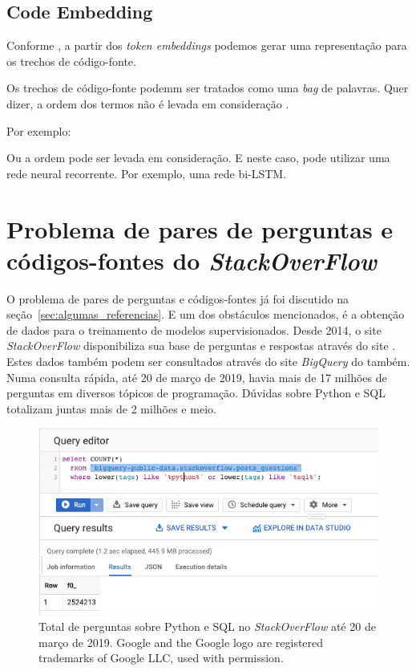 \subsection{Code Embedding}

Conforme \cite{cambronero-deep-learning-code-search:2019}, a partir dos \textit{token embeddings} podemos gerar uma representação para os trechos de código-fonte.

Os trechos de código-fonte podemm ser tratados como uma \textit{bag} de palavras. Quer dizer, a ordem dos termos não é levada em consideração \citep{cambronero-deep-learning-code-search:2019}.



Por exemplo:




Ou a ordem pode ser levada em consideração. E neste caso, pode utilizar uma rede neural recorrente. Por exemplo, uma rede bi-LSTM. 


\section{Problema de pares de perguntas e códigos-fontes do \textit{StackOverFlow}}

O problema de pares de perguntas e códigos-fontes já foi discutido na seção~\ref{sec:algumas_referencias}. E um dos obstáculos mencionados, é a obtenção de dados para o treinamento de modelos supervisionados. Desde 2014, o site \textit{StackOverFlow} disponibiliza sua base de perguntas e respostas através do site \cite{sof-2019}. Estes dados também podem ser consultados através do site \textit{BigQuery} do \cite{bigquery-2019} também. Numa consulta rápida, até 20 de março de 2019, havia mais de 17 milhões de perguntas em diversos tópicos de programação. Dúvidas sobre Python e SQL totalizam juntas mais de 2 milhões e meio.

\begin{figure}[h]
\includegraphics[width=12cm]{figuras/cap-problema/post-questions-python-sql-total.png}
\caption{Total de perguntas sobre Python e SQL no \textit{StackOverFlow} até 20 de março de 2019. Google and the Google logo are registered trademarks of Google LLC, used with permission.}
\label{fig:bigquery-total-questions-python-sql-stackoverflow}
\end{figure}

